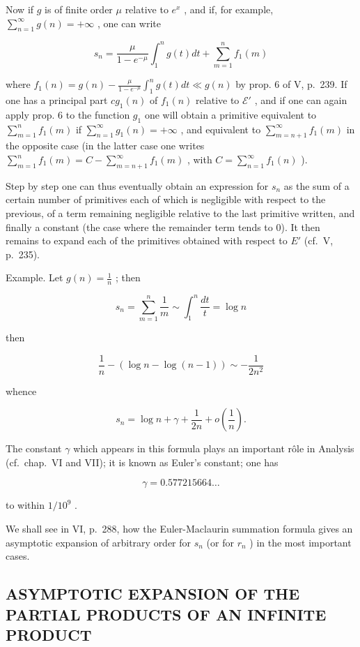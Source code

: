 Now if \(g\) is of finite order \(\mu\) relative to \(e^x\) , and if, for example, \(\sum_{n=1}^{\infty} g(n) = +\infty\) , one can write

\[
s _ {n} = \frac {\mu}{1 - e ^ {- \mu}} \int_ {1} ^ {n} g (t) d t + \sum_ {m = 1} ^ {n} f _ {1} (m)
\]

where \(f_{1}(n) = g(n) - \frac{\mu}{1 - e^{-\mu}}\int_{1}^{n}g(t)dt \ll g(n)\) by prop. 6 of V, p.~239. If one has a principal part \(cg_{1}(n)\) of \(f_{1}(n)\) relative to \(\mathcal{E}'\) , and if one can again apply prop. 6 to the function \(g_{1}\) one will obtain a primitive equivalent to \(\sum_{m=1}^{n}f_{1}(m)\) if \(\sum_{n=1}^{\infty}g_{1}(n) = +\infty\) , and equivalent to \(\sum_{m=n+1}^{\infty}f_{1}(m)\) in the opposite case (in the latter case one writes \(\sum_{m=1}^{n}f_{1}(m) = C - \sum_{m=n+1}^{\infty}f_{1}(m)\) , with \(C = \sum_{n=1}^{\infty}f_{1}(n)\) ).

Step by step one can thus eventually obtain an expression for \(s_{n}\) as the sum of a certain number of primitives each of which is negligible with respect to the previous, of a term remaining negligible relative to the last primitive written, and finally a constant (the case where the remainder term tends to 0). It then remains to expand each of the primitives obtained with respect to \(E'\) (cf.~V, p.~235).

Example. Let \(g(n) = \frac{1}{n}\) ; then

\[
s _ {n} = \sum_ {m = 1} ^ {n} \frac {1}{m} \sim \int_ {1} ^ {n} \frac {d t}{t} = \log n
\]

then

\[
\frac {1}{n} - (\log n - \log (n - 1)) \sim - \frac {1}{2 n ^ {2}}
\]

whence

\[
s _ {n} = \log n + \gamma + \frac {1}{2 n} + o \left(\frac {1}{n}\right).
\]

The constant \(\gamma\) which appears in this formula plays an important rôle in Analysis (cf.~chap.~VI and VII); it is known as Euler's constant; one has

\[
\gamma = 0. 5 7 7   2 1 5   6 6 4 \dots
\]

to within \(1/10^{9}\) .

We shall see in VI, p.~288, how the Euler-Maclaurin summation formula gives an asymptotic expansion of arbitrary order for \(s_n\) (or for \(r_n\) ) in the most important cases.

\subsection{ASYMPTOTIC EXPANSION OF THE PARTIAL PRODUCTS OF AN INFINITE PRODUCT}

